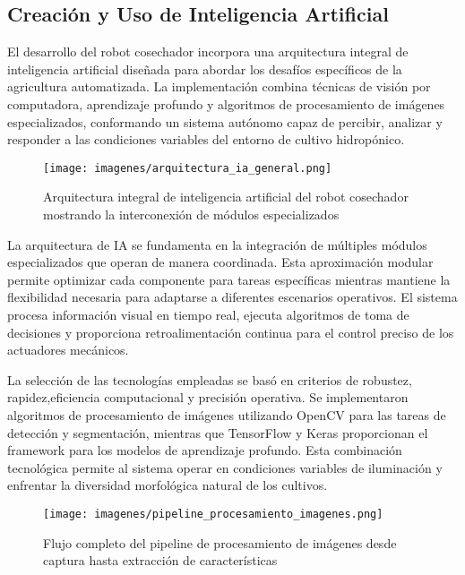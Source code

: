 \subsection{Creación y Uso de Inteligencia Artificial}

El desarrollo del robot cosechador incorpora una arquitectura integral de inteligencia artificial diseñada para abordar los desafíos específicos de la agricultura automatizada. La implementación combina técnicas de visión por computadora, aprendizaje profundo y algoritmos de procesamiento de imágenes especializados, conformando un sistema autónomo capaz de percibir, analizar y responder a las condiciones variables del entorno de cultivo hidropónico.

\begin{figure}[h]
\centering
\texttt{[image: imagenes/arquitectura\_ia\_general.png]}
\caption{Arquitectura integral de inteligencia artificial del robot cosechador mostrando la interconexión de módulos especializados}
\label{fig:arquitectura_ia_general}
\end{figure}

La arquitectura de IA se fundamenta en la integración de múltiples módulos especializados que operan de manera coordinada. Esta aproximación modular permite optimizar cada componente para tareas específicas mientras mantiene la flexibilidad necesaria para adaptarse a diferentes escenarios operativos. El sistema procesa información visual en tiempo real, ejecuta algoritmos de toma de decisiones y proporciona retroalimentación continua para el control preciso de los actuadores mecánicos.

La selección de las tecnologías empleadas se basó en criterios de robustez, rapidez,eficiencia computacional y precisión operativa. Se implementaron algoritmos de procesamiento de imágenes utilizando OpenCV para las tareas de detección y segmentación, mientras que TensorFlow y Keras proporcionan el framework para los modelos de aprendizaje profundo. Esta combinación tecnológica permite al sistema operar en condiciones variables de iluminación y enfrentar la diversidad morfológica natural de los cultivos.

\begin{figure}[h]
\centering
\texttt{[image: imagenes/pipeline\_procesamiento\_imagenes.png]}
\caption{Flujo completo del pipeline de procesamiento de imágenes desde captura hasta extracción de características}
\label{fig:pipeline_procesamiento}
\end{figure}

